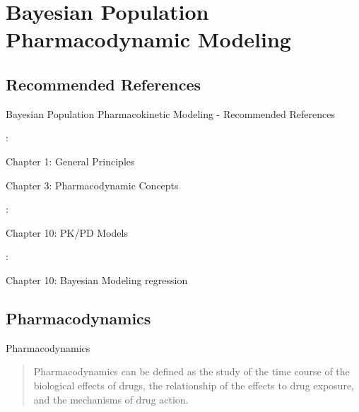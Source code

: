 \section{Bayesian Population Pharmacodynamic Modeling}

\subsection{Recommended References}
\begin{frame}{Bayesian Population Pharmacokinetic Modeling - Recommended References}
    \begin{vfilleditems}
        \item \textcite{Gabrielsson2006PKPDbook}:
        \begin{vfilleditems}
            \item Chapter 1: General Principles
            \item Chapter 3: Pharmacodynamic Concepts
        \end{vfilleditems}
        \item \textcite{Owen2014PKPDbook}:
        \begin{vfilleditems}
            \item Chapter 10: PK/PD Models
        \end{vfilleditems}
        \item \textcite{Bonate2011PKPDbook}:
        \begin{vfilleditems}
            \item Chapter 10: Bayesian Modeling regression
        \end{vfilleditems}
        \item \textcite{margossian2022torsten}
    \end{vfilleditems}
\end{frame}

\subsection{Pharmacodynamics}
\begin{frame}{Pharmacodynamics}
    \begin{defn}[Pharmacodynamics]
        \begin{quotation}
            Pharmacodynamics can be defined as the study of the time course of the
            biological effects of drugs, the relationship of the effects to drug exposure,
            and the mechanisms of drug action.
        \end{quotation}
        \vfill \vfill
        \textcite[199]{Gabrielsson2006PKPDbook}
    \end{defn}
\end{frame}

